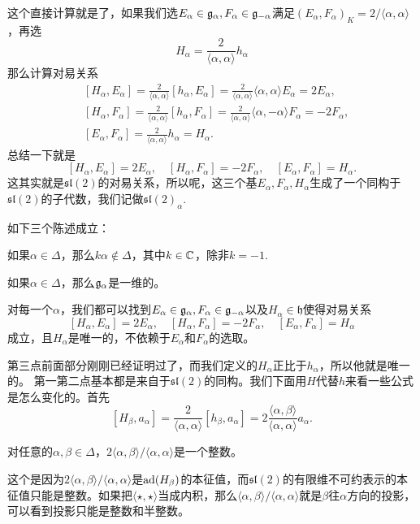 这个直接计算就是了，如果我们选$E_\alpha\in{\mathfrak{g}}_\alpha,F_\alpha\in{\mathfrak{g}}_{-\alpha}$满足$(E_\alpha,F_{\alpha})_K=2/\langle \alpha,\alpha \rangle$，再选
\[
	H_\alpha=\frac{2}{\langle \alpha,\alpha \rangle}h_\alpha
\]
那么计算对易关系
\[
	\begin{split}
	&[H_\alpha,E_\alpha]=\frac{2}{\langle \alpha,\alpha \rangle}[h_\alpha,E_\alpha]=\frac{2}{\langle \alpha,\alpha \rangle}\langle \alpha,\alpha \rangle E_\alpha=2E_\alpha,\\
	&[H_\alpha,F_\alpha]=\frac{2}{\langle \alpha,\alpha \rangle}[h_\alpha,F_\alpha]=\frac{2}{\langle \alpha,\alpha \rangle}\langle \alpha,-\alpha \rangle F_\alpha=-2F_\alpha,\\
	&[E_\alpha,F_\alpha]=\frac{2}{\langle \alpha,\alpha \rangle}h_\alpha=H_\alpha.
	\end{split}
\]
总结一下就是
\[
	[H_\alpha,E_\alpha]=2E_\alpha,\quad[H_\alpha,F_\alpha]=-2F_\alpha,\quad[E_\alpha,F_\alpha]=H_\alpha.
\]
这其实就是$\mathfrak{sl}(2)$的对易关系，所以呢，这三个基$E_\alpha,F_\alpha,H_\alpha$生成了一个同构于$\mathfrak{sl}(2)$的子代数，我们记做$\mathfrak{sl}(2)_\alpha$.\

\theo 如下三个陈述成立：

如果$\alpha\in\Delta$，那么$k\alpha\notin \Delta$，其中$k\in \mathbb{C}$，除非$k=-1$.

如果$\alpha\in\Delta$，那么${\mathfrak{g}}_\alpha$是一维的。

对每一个$\alpha$，我们都可以找到$E_\alpha\in{\mathfrak{g}}_\alpha,F_\alpha\in{\mathfrak{g}}_{-\alpha}$以及$H_\alpha\in\mathfrak{h}$使得对易关系
\[
[H_\alpha,E_\alpha]=2E_\alpha,\quad[H_\alpha,F_\alpha]=-2F_\alpha,\quad[E_\alpha,F_\alpha]=H_\alpha
\]
成立，且$H_\alpha$是唯一的，不依赖于$E_\alpha$和$F_\alpha$的选取。

第三点前面部分刚刚已经证明过了，而我们定义的$H_\alpha$正比于$h_\alpha$，所以他就是唯一的。
第一第二点基本都是来自于$\mathfrak{sl}(2)$的同构。我们下面用$H$代替$h$来看一些公式是怎么变化的。首先
\[
	[H_\beta,a_\alpha]=\frac{2}{\langle \alpha,\alpha \rangle}[h_\beta,a_\alpha]=2\frac{\langle \alpha,\beta \rangle}{\langle \alpha,\alpha \rangle} a_\alpha.
\]

\pro 对任意的$\alpha,\beta\in \Delta$，$2\langle \alpha,\beta \rangle/\langle \alpha,\alpha \rangle$是一个整数。

这个是因为$2\langle \alpha,\beta \rangle/\langle \alpha,\alpha \rangle$是$\operatorname{ad}(H_\beta)$的本征值，而$\mathfrak{sl}(2)$的有限维不可约表示的本征值只能是整数。如果把$\langle \star,\star \rangle$当成内积，那么$\langle \alpha,\beta \rangle/\langle \alpha,\alpha \rangle$就是$\beta$往$\alpha$方向的投影，可以看到投影只能是整数和半整数。

